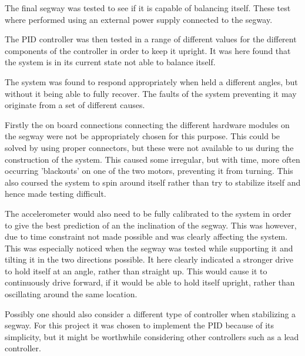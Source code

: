 The final segway was tested to see if it is capable of balancing itself.
These test where performed using an external power supply connected to the segway.

The PID controller was then tested in a range of different values for the different components of the controller in order to keep it upright.
It was here found that the system is in its current state not able to balance itself.

The system was found to respond appropriately when held a different angles, but without it being able to fully recover.
The faults of the system preventing it may originate from a set of different causes.

Firstly the on board connections connecting the different hardware modules on the segway were not be appropriately chosen for this purpose.
This could be solved by using proper connectors, but these were not available to us during the construction of the system.
This caused some irregular, but with time, more often occurring 'blackouts' on one of the two motors, preventing it from turning.
This also coursed the system to spin around itself rather than try to stabilize itself and hence made testing difficult.

The accelerometer would also need to be fully calibrated to the system in order to give the best prediction of an the inclination of the segway.
This was however, due to time constraint not made possible and was clearly affecting the system.
This was especially noticed when the segway was tested while supporting it and tilting it in the two directions possible.
It here clearly indicated a stronger drive to hold itself at an angle, rather than straight up.
This would cause it to continuously drive forward, if it would be able to hold itself upright, rather than oscillating around the same location.

Possibly one should also consider a different type of controller when stabilizing a segway.
For this project it was chosen to implement the PID because of its simplicity, but it might be worthwhile considering other controllers such as a lead controller.